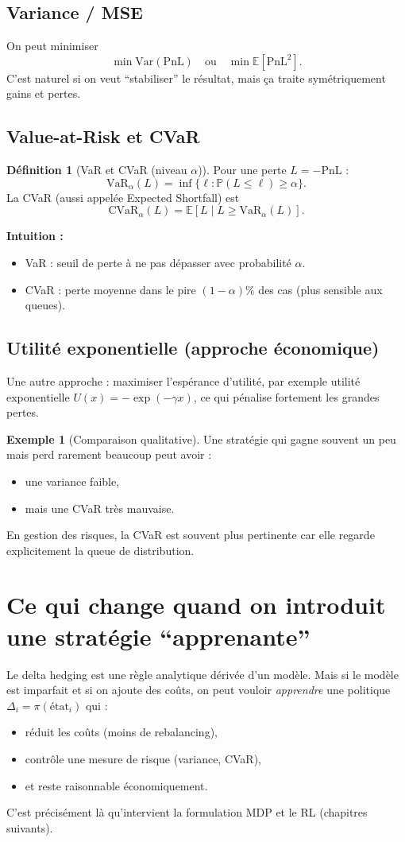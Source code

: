 \documentclass[11pt,a4paper]{report}
\newcommand{\E}{\mathbb{E}}
\newcommand{\Var}{\mathrm{Var}}
\newcommand{\Prob}{\mathbb{P}}
\newcommand{\1}{\mathbbm{1}}
\newcommand{\PnL}{\mathrm{PnL}}
\newcommand{\CVaR}{\mathrm{CVaR}}
\newcommand{\VaR}{\mathrm{VaR}}
\theoremstyle{definition}
\newtheorem{definition}{Définition}[chapter]
\newtheorem{example}{Exemple}[chapter]
\theoremstyle{plain}
\theoremstyle{remark}
\begin{document}
\subsection{Variance / MSE}
On peut minimiser
\[
\min \Var(\PnL) \quad \text{ou} \quad \min \E[\PnL^2].
\]
C'est naturel si on veut ``stabiliser'' le résultat, mais ça traite symétriquement gains et pertes.

\subsection{Value-at-Risk et CVaR}
\begin{definition}[VaR et CVaR (niveau $\alpha$)]
Pour une perte $L=-\PnL$ :
\[
\VaR_\alpha(L) = \inf\{ \ell : \Prob(L\le \ell)\ge \alpha\}.
\]
La CVaR (aussi appelée Expected Shortfall) est
\[
\CVaR_\alpha(L)=\E[L\mid L\ge \VaR_\alpha(L)].
\]
\end{definition}

\textbf{Intuition :}
\begin{itemize}
  \item VaR : seuil de perte à ne pas dépasser avec probabilité $\alpha$.
  \item CVaR : perte moyenne dans le pire $(1-\alpha)\%$ des cas (plus sensible aux queues).
\end{itemize}

\subsection{Utilité exponentielle (approche économique)}
Une autre approche : maximiser l'espérance d'utilité,
par exemple utilité exponentielle $U(x)=-\exp(-\gamma x)$,
ce qui pénalise fortement les grandes pertes.

\begin{example}[Comparaison qualitative]
Une stratégie qui gagne souvent un peu mais perd rarement beaucoup peut avoir :
\begin{itemize}
  \item une variance faible,
  \item mais une CVaR très mauvaise.
\end{itemize}
En gestion des risques, la CVaR est souvent plus pertinente car elle regarde explicitement la queue de distribution.
\end{example}

\section{Ce qui change quand on introduit une stratégie ``apprenante''}
Le delta hedging est une règle analytique dérivée d'un modèle.
Mais si le modèle est imparfait et si on ajoute des coûts,
on peut vouloir \emph{apprendre} une politique $\Delta_i=\pi(\text{état}_i)$ qui :
\begin{itemize}
  \item réduit les coûts (moins de rebalancing),
  \item contrôle une mesure de risque (variance, CVaR),
  \item et reste raisonnable économiquement.
\end{itemize}
C'est précisément là qu'intervient la formulation MDP et le RL (chapitres suivants).
\end{document}
